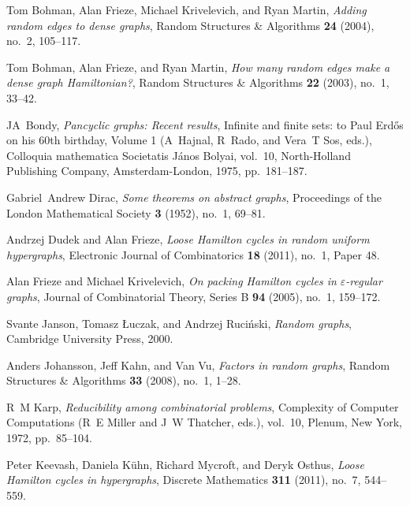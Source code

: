 \documentclass[11pt,english]{article}
\theoremstyle{plain}
\theoremstyle{definition}
\theoremstyle{definition}
\theoremstyle{plain}
\theoremstyle{plain}
\theoremstyle{plain}
\theoremstyle{plain}
\theoremstyle{remark}
\theoremstyle{remark}
\begin{document}

\providecommand{\bysame}{\leavevmode\hbox to3em{\hrulefill}\thinspace}
\providecommand{\MR}{\relax\ifhmode\unskip\space\fi MR }
\providecommand{\MRhref}[2]{%
  \href{http://www.ams.org/mathscinet-getitem?mr=#1}{#2}
}
\providecommand{\href}[2]{#2}
\begin{thebibliography}{10}

Tom Bohman, Alan Frieze, Michael Krivelevich, and Ryan Martin, \emph{Adding
  random edges to dense graphs}, Random Structures \& Algorithms \textbf{24}
  (2004), no.~2, 105--117.

Tom Bohman, Alan Frieze, and Ryan Martin, \emph{How many random edges make a
  dense graph {H}amiltonian?}, Random Structures \& Algorithms \textbf{22}
  (2003), no.~1, 33--42.

JA~Bondy, \emph{Pancyclic graphs: Recent results}, Infinite and finite sets: to
  {P}aul {E}rd\H{o}s on his 60th birthday, Volume 1 (A~Hajnal, R~Rado, and
  Vera~T Sos, eds.), Colloquia mathematica Societatis J\'anos Bolyai, vol.~10,
  North-Holland Publishing Company, Amsterdam-London, 1975, pp.~181--187.

Gabriel~Andrew Dirac, \emph{Some theorems on abstract graphs}, Proceedings of
  the London Mathematical Society \textbf{3} (1952), no.~1, 69--81.

Andrzej Dudek and Alan Frieze, \emph{Loose {H}amilton cycles in random uniform
  hypergraphs}, Electronic Journal of Combinatorics \textbf{18} (2011), no.~1,
  Paper 48.

Alan Frieze and Michael Krivelevich, \emph{On packing {H}amilton cycles in
  $\varepsilon$-regular graphs}, Journal of Combinatorial Theory, Series B
  \textbf{94} (2005), no.~1, 159--172.

Svante Janson, Tomasz {\L{}}uczak, and Andrzej Ruci{\'n}ski, \emph{Random
  graphs}, Cambridge University Press, 2000.

Anders Johansson, Jeff Kahn, and Van Vu, \emph{Factors in random graphs},
  Random Structures \& Algorithms \textbf{33} (2008), no.~1, 1--28.

R~M Karp, \emph{Reducibility among combinatorial problems}, Complexity of
  Computer Computations (R~E Miller and J~W Thatcher, eds.), vol.~10, Plenum,
  New York, 1972, pp.~85--104.

Peter Keevash, Daniela K{\"u}hn, Richard Mycroft, and Deryk Osthus, \emph{Loose
  {H}amilton cycles in hypergraphs}, Discrete Mathematics \textbf{311} (2011),
  no.~7, 544--559.


\end{thebibliography}
\end{document}
